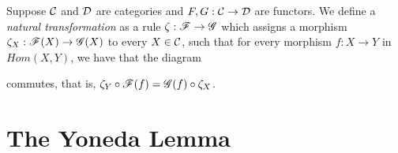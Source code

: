 \begin{definition}
Suppose $\mathcal{C}$ and $\mathcal{D}$ are categories and $F,G:\mathcal{C}\to\mathcal{D}$ are functors. We define a \textit{natural transformation} as a rule $\zeta:\mathscr{F}\to\mathscr{G}$ which assigns a morphism $\zeta_X:\mathscr{F}(X)\to \mathscr{G}(X)$ to every $X\in \mathcal{C}$, such that for every morphism $f:X\to Y$ in $Hom(X,Y)$, we have that the diagram


commutes, that is, $\zeta_Y\circ \mathscr{F}(f)=\mathscr{G}(f)\circ\zeta_X$.
\end{definition}


\section{The Yoneda Lemma}


